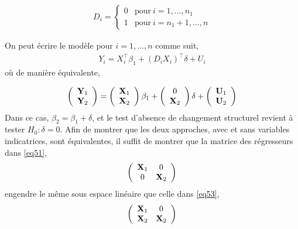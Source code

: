 \begin{align*}
D_i = 
\left\{
\begin{array}{cl}
0& \textrm{pour} \ i = 1,...,n_1\\
1& \textrm{pour} \ i = n_1 + 1,...,n
\end{array}
\right.
\end{align*}

On peut écrire le modèle pour $i=1,...,n$ comme suit,
\begin{align*}
Y_i = X_i^\top\beta_1 + (D_iX_i)^\top\delta + U_i
\end{align*}
où de manière équivalente,

\begin{align}
\left(
\begin{array}{c}
\mathbf Y_1\\
\mathbf Y_2
\end{array}
\right)
=
\left(
\begin{array}{c}
\mathbf X_1\\
\mathbf X_2
\end{array}
\right)
\beta_1
+
\left(
\begin{array}{c}
0\\
\mathbf X_2
\end{array}
\right)
\delta
+
\left(
\begin{array}{c}
\mathbf U_1\\
\mathbf U_2
\end{array}
\right)
\label{eq53}
\end{align}
Dans ce cas, $\beta_2 = \beta_1+\delta$, et le test d'absence de changement structurel revient à tester $H_0:\delta = 0$. Afin de montrer que les deux approches, avec et sans variables indicatrices, sont équivalentes, il suffit de montrer que la matrice des régresseurs dans \eqref{eq51},
\begin{align*}
\left(
\begin{array}{cc}
\mathbf X_1&0\\
0&\mathbf X_2
\end{array}
\right)
\end{align*}
engendre le même sous espace linéaire que celle dans \eqref{eq53},
\begin{align*}
\left(
\begin{array}{cc}
\mathbf X_1&0\\
\mathbf X_2&\mathbf X_2
\end{array}
\right)
\end{align*}

